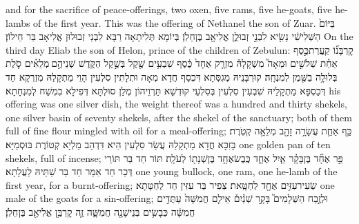 {and for the sacrifice of peace-offerings, two oxen, five rams, five he-goats, five he-lambs of the first year. This was the offering of Nethanel the son of Zuar.}{}
{בַּיּוֹם֙ הַשְּׁלִישִׁ֔י נָשִׂ֖יא לִבְנֵ֣י זְבוּלֻ֑ן אֱלִיאָ֖ב בֶּן\maqqaf חֵלֹֽן׃}
{בְּיוֹמָא תְּלִיתָאָה רַבָּא לִבְנֵי זְבוּלוּן אֱלִיאָב בַּר חֵילוֹן׃}
{On the third day Eliab the son of Helon, prince of the children of Zebulun:}{}
{קׇרְבָּנ֞וֹ קַֽעֲרַת\maqqaf כֶּ֣סֶף אַחַ֗ת שְׁלֹשִׁ֣ים וּמֵאָה֮ מִשְׁקָלָהּ֒ מִזְרָ֤ק אֶחָד֙ כֶּ֔סֶף שִׁבְעִ֥ים שֶׁ֖קֶל בְּשֶׁ֣קֶל הַקֹּ֑דֶשׁ שְׁנֵיהֶ֣ם \legarmeh  מְלֵאִ֗ים סֹ֛לֶת בְּלוּלָ֥ה בַשֶּׁ֖מֶן לְמִנְחָֽה׃}
{קוּרְבָּנֵיהּ מְגִסְּתָא דִּכְסַף חֲדָא מְאָה וּתְלָתִין סִלְעִין הָוֵי מַתְקָלַהּ מִזְרְקָא חַד דְּכַסְפָּא מַתְקָלֵיהּ שִׁבְעִין סִלְעִין בְּסִלְעֵי קוּדְשָׁא תַּרְוֵיהוֹן מְלַן סוּלְתָּא דְּפִילָא בִמְשַׁח לְמִנְחָתָא׃}
{his offering was one silver dish, the weight thereof was a hundred and thirty shekels, one silver basin of seventy shekels, after the shekel of the sanctuary; both of them full of fine flour mingled with oil for a meal-offering;}{}
{כַּ֥ף אַחַ֛ת עֲשָׂרָ֥ה זָהָ֖ב מְלֵאָ֥ה קְטֹֽרֶת׃}
{בָּזִכָּא חֲדָא מַתְקָלַהּ עֲשַׂר סִלְעִין הִיא דִּדְהַב מַלְיָא קְטוֹרֶת בּוּסְמַיָּא׃}
{one golden pan of ten shekels, full of incense;}{}
{פַּ֣ר אֶחָ֞ד בֶּן\maqqaf בָּקָ֗ר אַ֧יִל אֶחָ֛ד כֶּֽבֶשׂ\maqqaf אֶחָ֥ד בֶּן\maqqaf שְׁנָת֖וֹ לְעֹלָֽה׃}
{תּוֹר חַד בַּר תּוֹרֵי דְּכַר חַד אִמַּר חַד בַּר שַׁתֵּיהּ לַעֲלָתָא׃}
{one young bullock, one ram, one he-lamb of the first year, for a burnt-offering;}{}
{שְׂעִיר\maqqaf עִזִּ֥ים אֶחָ֖ד לְחַטָּֽאת׃}
{צְפִיר בַּר עִזִּין חַד לְחַטָּתָא׃}
{one male of the goats for a sin-offering;}{}
{וּלְזֶ֣בַח הַשְּׁלָמִים֮ בָּקָ֣ר שְׁנַ֒יִם֒ אֵילִ֤ם חֲמִשָּׁה֙ עַתֻּדִ֣ים חֲמִשָּׁ֔ה כְּבָשִׂ֥ים בְּנֵי\maqqaf שָׁנָ֖ה חֲמִשָּׁ֑ה זֶ֛ה קׇרְבַּ֥ן אֱלִיאָ֖ב בֶּן\maqqaf חֵלֹֽן׃ \petucha }
